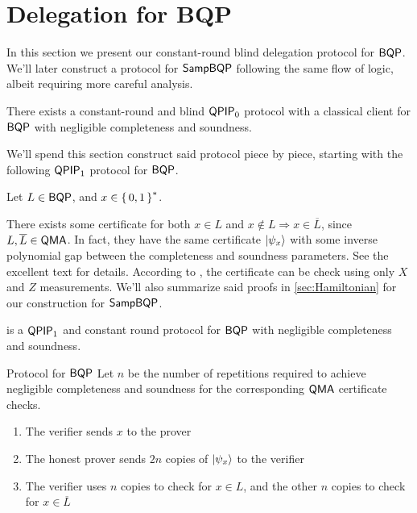 \section{Delegation for BQP}
\label{sec:BlindBQP}

In this section we present our constant-round blind delegation protocol for $\operatorname{\mathsf{BQP}}$.
We'll later construct a protocol for $\operatorname{\mathsf{SampBQP}}$ following the same flow of logic, albeit requiring more careful analysis.

\begin{thm}
	There exists a constant-round and blind $\operatorname{\mathsf{QPIP}}_0$ protocol with a classical client for $\operatorname{\mathsf{BQP}}$ with negligible completeness and soundness.
\end{thm}

We'll spend this section construct said protocol piece by piece, starting with the following $\operatorname{\mathsf{QPIP}}_1$ protocol for $\operatorname{\mathsf{BQP}}$.

Let $L\in\operatorname{\mathsf{BQP}}$, and $x\in\set{0,1}^*$.

There exists some certificate for both $x\in L$ and $x\notin L\Rightarrow x\in\overline{L}$, since $L, \overline{L}\in\operatorname{\mathsf{QMA}}$.
In fact, they have the same certificate $\ket{\psi_x}$ with some inverse polynomial gap between the completeness and soundness parameters.
See the excellent text \cite{kitaev2002classical} for details.
According to \cite{PhysRevA.93.022326}, the certificate can be check using only $X$ and $Z$ measurements.
We'll also summarize said proofs in \cref{sec:Hamiltonian} for our construction for $\operatorname{\mathsf{SampBQP}}$.

\begin{thm}
	 is a $\operatorname{\mathsf{QPIP}}_1$ and constant round protocol for $\operatorname{\mathsf{BQP}}$ with negligible completeness and soundness.
\end{thm}

\begin{protocol}{Protocol for $\operatorname{\mathsf{BQP}}$}
	\label{proto:BQP}
	Let $n$ be the number of repetitions required to achieve negligible completeness and soundness for the corresponding $\operatorname{\mathsf{QMA}}$ certificate checks.
	\begin{enumerate}
		\item The verifier sends $x$ to the prover
		\item The honest prover sends $2n$ copies of $\ket{\psi_x}$ to the verifier
		\item The verifier uses $n$ copies to check for $x\in L$, and the other $n$ copies to check for $x\in\overline{L}$
	\end{enumerate}
\end{protocol}

